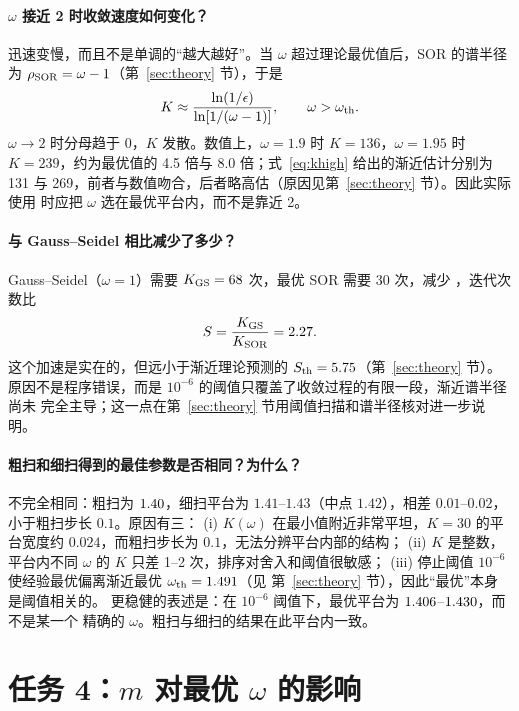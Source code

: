 \documentclass[UTF8,fontset=windows,a4paper,11pt]{ctexart}
\begin{document}
\paragraph{$\omega$ 接近 2 时收敛速度如何变化？}
迅速变慢，而且不是单调的“越大越好”。当 $\omega$ 超过理论最优值后，SOR 的谱半径为
$\rho_{\rm SOR}=\omega-1$（第~\ref{sec:theory} 节），于是
\begin{equation}
K\approx\frac{\ln(1/\epsilon)}{\ln[1/(\omega-1)]},
\qquad \omega>\omega_{\rm th}.
\label{eq:khigh}
\end{equation}
$\omega\to2$ 时分母趋于 0，$K$ 发散。数值上，$\omega=1.9$ 时 $K=136$，$\omega=1.95$
时 $K=239$，约为最优值的 4.5 倍与 8.0 倍；式~\eqref{eq:khigh} 给出的渐近估计分别为
131 与 269，前者与数值吻合，后者略高估（原因见第~\ref{sec:theory} 节）。因此实际使用
时应把 $\omega$ 选在最优平台内，而不是靠近 2。

\paragraph{与 Gauss--Seidel 相比减少了多少？}
Gauss--Seidel（$\omega=1$）需要 $K_{\rm GS}=68$ 次，最优 SOR 需要 30 次，减少
\RedThree，迭代次数比
\begin{equation}
S=\frac{K_{\rm GS}}{K_{\rm SOR}}=2.27 .
\label{eq:s}
\end{equation}
这个加速是实在的，但远小于渐近理论预测的 $S_{\rm th}=5.75$（第~\ref{sec:theory} 节）。
原因不是程序错误，而是 $10^{-6}$ 的阈值只覆盖了收敛过程的有限一段，渐近谱半径尚未
完全主导；这一点在第~\ref{sec:theory} 节用阈值扫描和谱半径核对进一步说明。

\paragraph{粗扫和细扫得到的最佳参数是否相同？为什么？}
不完全相同：粗扫为 $1.40$，细扫平台为 $1.41$--$1.43$（中点 $1.42$），相差
$0.01$--$0.02$，小于粗扫步长 $0.1$。原因有三：
(i) $K(\omega)$ 在最小值附近非常平坦，$K=30$ 的平台宽度约 $0.024$，而粗扫步长为
$0.1$，无法分辨平台内部的结构；
(ii) $K$ 是整数，平台内不同 $\omega$ 的 $K$ 只差 1--2 次，排序对舍入和阈值很敏感；
(iii) 停止阈值 $10^{-6}$ 使经验最优偏离渐近最优 $\omega_{\rm th}=1.491$（见
第~\ref{sec:theory} 节），因此“最优”本身是阈值相关的。
更稳健的表述是：在 $10^{-6}$ 阈值下，最优平台为 $1.406$--$1.430$，而不是某一个
精确的 $\omega$。粗扫与细扫的结果在此平台内一致。

\section{任务 4：\texorpdfstring{$m$}{m} 对最优 \texorpdfstring{$\omega$}{omega} 的影响}
\label{sec:task4}
\end{document}
